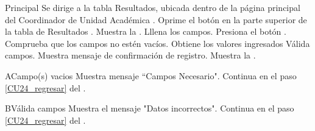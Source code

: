     \begin{UCtrayectoria}{Principal}
    \UCpaso[\UCactor] Se dirige a la tabla Resultados, ubicada dentro de la página principal del Coordinador de Unidad Académica .
    \UCpaso[\UCactor] Oprime el botón  en la parte superior de la tabla de Resultados .
    \UCpaso Muestra la . 
    \UCpaso[\UCactor] Lllena los campos. \label{CU24_regresar}  
    \UCpaso[\UCactor] Presiona el botón .
    \UCpaso Comprueba que los campos no estén vacíos. 
    \UCpaso Obtiene los valores ingresados
    \UCpaso Válida campos. 
    \UCpaso Muestra mensaje de confirmación de registro.
    \UCpaso Muestra la .
\end{UCtrayectoria}

\begin{UCtrayectoriaA}{A}{Campo(s) vacios}
	\UCpaso Muestra mensaje “Campos Necesario".
	\UCpaso Continua en el paso \ref{CU24_regresar} del .
\end{UCtrayectoriaA}

\begin{UCtrayectoriaA}{B}{Válida campos}
	\UCpaso Muestra el mensaje "Datos incorrectos".
	\UCpaso Continua en el paso \ref{CU24_regresar} del .
\end{UCtrayectoriaA}


	


